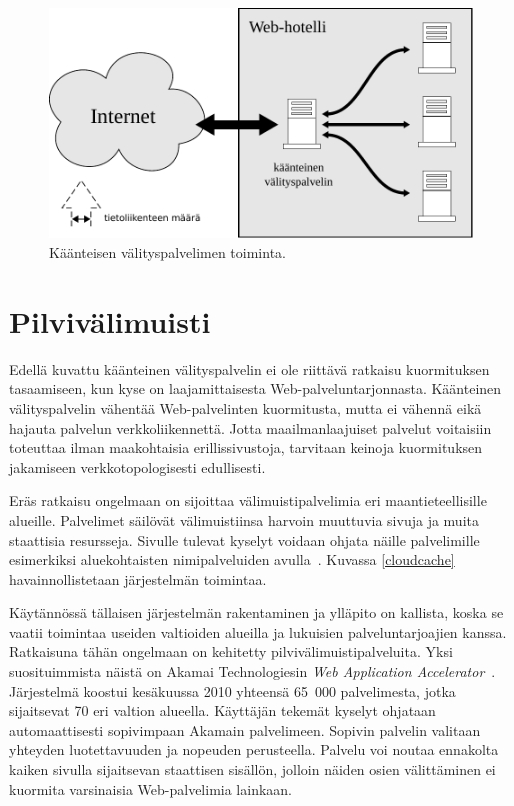 \begin{figure}[htp]
\centering
\includegraphics[width=12cm]{pics/reverseproxy.pdf}
\caption{Käänteisen välityspalvelimen toiminta.}
\label{reverseproxy}
\end{figure}

\section{Pilvivälimuisti}

Edellä kuvattu käänteinen välityspalvelin ei ole riittävä ratkaisu
kuormituksen tasaamiseen, kun kyse on laajamittaisesta
Web-palveluntarjonnasta. Käänteinen välityspalvelin vähentää
Web-palvelinten kuormitusta, mutta ei vähennä eikä hajauta palvelun
verkkoliikennettä. Jotta maailmanlaajuiset palvelut voitaisiin
toteuttaa ilman maakohtaisia erillissivustoja, tarvitaan keinoja
kuormituksen jakamiseen verkkotopologisesti edullisesti.

Eräs ratkaisu ongelmaan on sijoittaa välimuistipalvelimia
eri maantieteellisille alueille. Palvelimet säilövät välimuistiinsa harvoin
muuttuvia sivuja ja muita staattisia resursseja. Sivulle tulevat
kyselyt voidaan ohjata näille palvelimille esimerkiksi aluekohtaisten
nimipalveluiden avulla~\cite{geodns}. Kuvassa \ref{cloudcache} havainnollistetaan
järjestelmän toimintaa.

Käytännössä tällaisen järjestelmän rakentaminen ja ylläpito on
kallista, koska se vaatii toimintaa useiden valtioiden alueilla ja
lukuisien palveluntarjoajien kanssa. Ratkaisuna tähän ongelmaan on kehitetty
pilvivälimuistipalveluita.
Yksi suosituimmista näistä on Akamai Technologiesin
\textit{Web Ap\-plic\-a\-tion Accelerator}~\cite{akamai}. Järjestelmä
koostui kesäkuussa 2010 yhteensä 65~000 palvelimesta, jotka
sijaitsevat 70 eri valtion alueella. Käyttäjän tekemät kyselyt
ohjataan automaattisesti sopivimpaan Akamain palvelimeen. Sopivin
palvelin valitaan yhteyden luotettavuuden ja nopeuden
perusteella. Palvelu voi noutaa ennakolta kaiken sivulla sijaitsevan
staattisen sisällön, jolloin näiden osien välittäminen ei kuormita
varsinaisia Web-palvelimia lainkaan.

